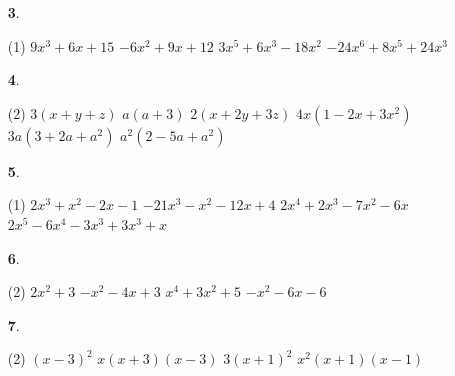 \documentclass[a4paper, pdf, twoside]{book}
\begin{document}
\begin{multicols}{2}
\begin{enumerate}

 \item[\fontfamily{phv}\selectfont\color{blue}\textbf{3}. ] 
 \begin{tasks}[column-sep=1em, item-indent=1.3333em](1)
	 \task $9x^3+6x+15$
	 \task $-6x^2+9x+12$
	 \task $3x^5+6x^3-18x^2$
	 \task $-24x^6+8x^5+24x^3$
\end{tasks}
\vspace{0.25cm}



 \item[\fontfamily{phv}\selectfont\color{blue}\textbf{4}. ] 
 \begin{tasks}[column-sep=1em, item-indent=1.3333em](2)
	 \task $3(x+y+z)$
	 \task $a(a+3)$
	 \task $2(x+2y+3z)$
	 \task $4x(1-2x+3x^2)$
	 \task $3a(3+2a+a^2)$
	 \task $a^2(2-5a+a^2)$
\end{tasks}
\vspace{0.25cm}



 \item[\fontfamily{phv}\selectfont\color{blue}\textbf{5}. ] 
 \begin{tasks}[column-sep=1em, item-indent=1.3333em](1)
	 \task $2x^3+x^2-2x-1$
	 \task $-21x^3-x^2-12x+4$
	 \task $2x^4+2x^3-7x^2-6x$
	 \task $2x^5-6x^4-3x^3+3x^3+x$
\end{tasks}
\vspace{0.25cm}



 \item[\fontfamily{phv}\selectfont\color{blue}\textbf{6}. ] 
 \begin{tasks}[column-sep=1em, item-indent=1.3333em](2)
	 \task $2x^2+3$
	 \task $-x^2-4x+3$
	 \task $x^4+3x^2+5$
	 \task $-x^2-6x-6$
\end{tasks}
\vspace{0.25cm}



 \item[\fontfamily{phv}\selectfont\color{blue}\textbf{7}. ] 
 \begin{tasks}[column-sep=1em, item-indent=1.3333em](2)
	 \task $(x-3)^2$
	 \task $x(x+3)(x-3)$
	 \task $3(x+1)^2$
	 \task $x^2(x+1)(x-1)$
\end{tasks}
 \end{enumerate}
\vfill\null
\columnbreak
\def\currentname{Solucions del Tema 6}
\vspace*{0.75cm}


\end{multicols}
\end{document}
